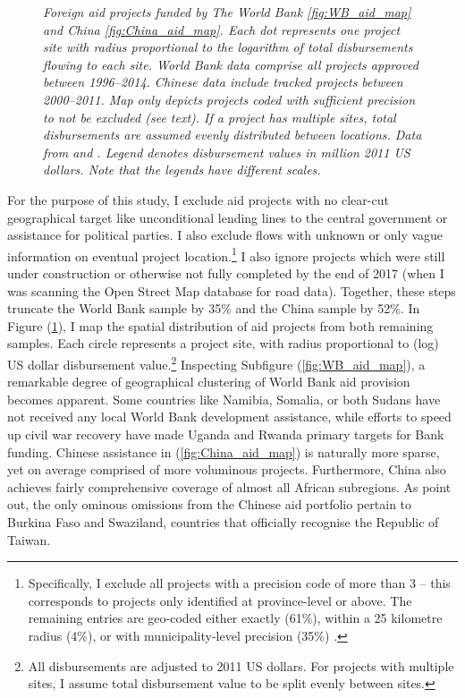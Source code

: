 \documentclass[11pt, oneside]{article}   	%
\let\oldref\ref
\renewcommand{\ref}[1]{(\oldref{#1})}
\newcommand{\mysubcaption}[1]{
\justify
\begin{spacing}{0.7}
\textit{\footnotesize #1}
\end{spacing}}
\begin{document}
\begin{figure}[t]
\label{fig:Aid_maps}
\mysubcaption{Foreign aid projects funded by The World Bank \eqref{fig:WB_aid_map} and China \eqref{fig:China_aid_map}. Each dot represents one project site with radius proportional to the logarithm of total disbursements flowing to each site. World Bank data comprise all projects approved between 1996--2014. Chinese data include tracked projects between 2000--2011. Map only depicts projects coded with sufficient precision to not be excluded (see text). If a project has multiple sites, total disbursements are assumed evenly distributed between locations. Data from \cite{AidData_WorldBankGeocoded_2017} and \cite{Strange_TrackingUnderreportedFinancial_2017}. Legend denotes disbursement values in million 2011 US dollars. Note that the legends have different scales.}
\end{figure}

For the purpose of this study, I exclude aid projects with no clear-cut geographical target like unconditional lending lines to the central government or assistance for political parties. I also exclude flows with unknown or only vague information on eventual project location.\footnote{Specifically, I exclude all projects with a precision code of more than 3 -- this corresponds to projects only identified at province-level or above. The remaining entries are geo-coded either exactly (61\%), within a 25 kilometre radius (4\%), or with municipality-level precision (35\%) \citep{Strandow_UCDPAidDataCodebook_2011}.} I also ignore projects which were still under construction or otherwise not fully completed by the end of 2017 (when I was scanning the Open Street Map database for road data). Together, these steps truncate the World Bank sample by 35\% and the China sample by 52\%. In Figure \ref{fig:Aid_maps}, I map the spatial distribution of aid projects from both remaining samples. Each circle represents a project site, with radius proportional to (log) US dollar disbursement value.\footnote{All disbursements are adjusted to 2011 US dollars. For projects with multiple sites, I assume total disbursement value to be split evenly between sites.} Inspecting Subfigure \ref{fig:WB_aid_map}, a remarkable degree of geographical clustering of World Bank aid provision becomes apparent. Some countries like Namibia, Somalia, or both Sudans have not received any local World Bank development assistance, while efforts to speed up civil war recovery have made Uganda and Rwanda primary targets for Bank funding. Chinese assistance in \ref{fig:China_aid_map} is naturally more sparse, yet on average comprised of more voluminous projects. Furthermore, China also achieves fairly comprehensive coverage of almost all African subregions. As \cite{Strange_TrackingUnderreportedFinancial_2017} point out, the only ominous omissions from the Chinese aid portfolio pertain to Burkina Faso and Swaziland, countries that officially recognise the Republic of Taiwan.
\end{document}
